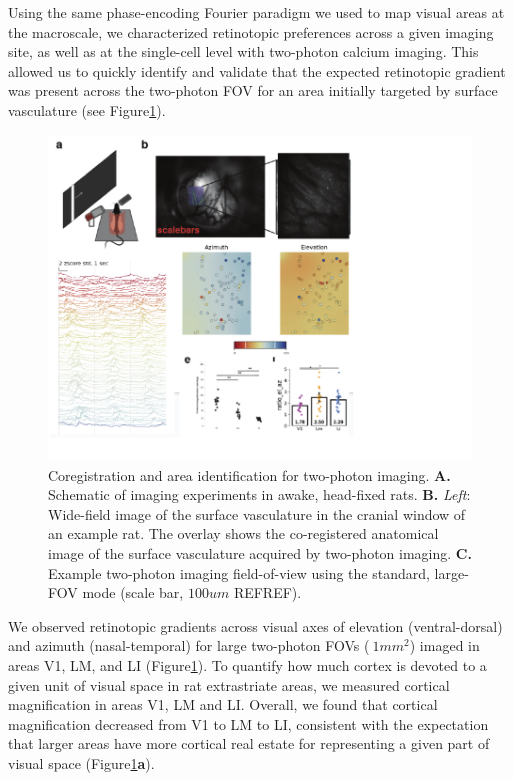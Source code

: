Using the same phase-encoding Fourier paradigm we used to map visual areas at the macroscale, we characterized retinotopic preferences across a given imaging site, as well as at the single-cell level with two-photon calcium imaging. This allowed us to quickly identify and validate that the expected retinotopic gradient was present across the two-photon FOV for an area initially targeted by surface vasculature (see Figure\ref{fig:2p_retino}).

\begin{figure}
    \includegraphics[width=\textwidth]{figures/chapter_3/2p_retino/2p_retino.pdf}
    \vspace{.1in}
    \caption[Identification of areas with two-photon imaging]{Coregistration and area identification for two-photon imaging. \textbf{A.} Schematic of imaging experiments in awake, head-fixed rats. \textbf{B.} \textit{Left}: Wide-field image of the surface vasculature in the cranial window of an example rat. The overlay shows the co-registered anatomical image of the surface vasculature acquired by two-photon imaging. \textbf{C.} Example two-photon imaging field-of-view using the standard, large-FOV mode (scale bar, $100um$ REFREF). 
    \label{fig:2p_retino}}
\end{figure}

We observed retinotopic gradients across visual axes of elevation (ventral-dorsal) and azimuth (nasal-temporal) for large two-photon FOVs ($~1mm^2$) imaged in areas V1, LM, and LI (Figure\ref{fig:2p_retino}). To quantify how much cortex is devoted to a given unit of visual space in rat extrastriate areas, we measured cortical magnification in areas V1, LM and LI. Overall, we found that cortical magnification decreased from V1 to LM to LI, consistent with the expectation that larger areas have more cortical real estate for representing a given part of visual space (Figure\ref{fig:2p_retino}\textbf{a}). 

